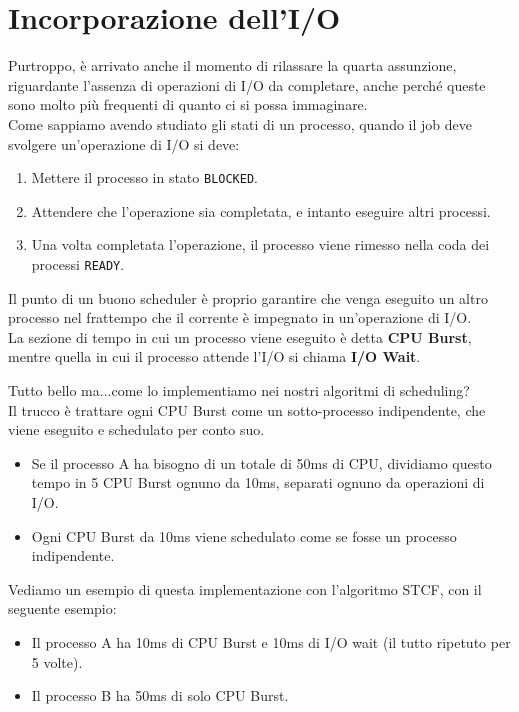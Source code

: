 \documentclass[12pt]{report}
\begin{document}
	\section{Incorporazione dell'I/O}
	Purtroppo, è arrivato anche il momento di rilassare la quarta assunzione, riguardante l'assenza di operazioni di I/O da completare, anche perché queste sono molto più frequenti di quanto ci si possa immaginare.\\
	Come sappiamo avendo studiato gli stati di un processo, quando il job deve svolgere un'operazione di I/O si deve:
	\begin{enumerate}
		\item Mettere il processo in stato \texttt{BLOCKED}.
		
		\item Attendere che l'operazione sia completata, e intanto eseguire altri processi.
		
		\item Una volta completata l'operazione, il processo viene rimesso nella coda dei processi \texttt{READY}.
	\end{enumerate}
	Il punto di un buono scheduler è proprio garantire che venga eseguito un altro processo nel frattempo che il corrente è impegnato in un'operazione di I/O.\\
	La sezione di tempo in cui un processo viene eseguito è detta \textbf{CPU Burst}, mentre quella in cui il processo attende l'I/O si chiama \textbf{I/O Wait}.
	\smallbreak
	
	Tutto bello ma...come lo implementiamo nei nostri algoritmi di scheduling?\\
	Il trucco è trattare ogni CPU Burst come un sotto-processo indipendente, che viene eseguito e schedulato per conto suo.
	\begin{itemize}
		\item Se il processo A ha bisogno di un totale di 50ms di CPU, dividiamo questo tempo in 5 CPU Burst ognuno da 10ms, separati ognuno da operazioni di I/O.
		
		\item Ogni CPU Burst da 10ms viene schedulato come se fosse un processo indipendente.
	\end{itemize}
	
	Vediamo un esempio di questa implementazione con l'algoritmo STCF, con il seguente esempio:
	\begin{itemize}
		\item Il processo A ha 10ms di CPU Burst e 10ms di I/O wait (il tutto ripetuto per 5 volte).
		
		\item Il processo B ha 50ms di solo CPU Burst.
	\end{itemize}
	
\end{document}
